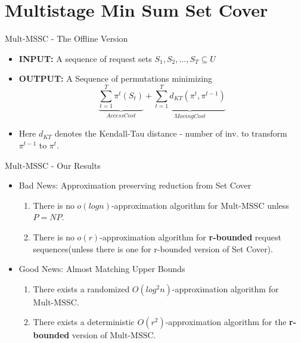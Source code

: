 \documentclass{beamer}
\def\DSSC{\mathrm{Mult}\text{-}\mathrm{MSSC}}
\begin{document}
\section{Multistage Min Sum Set Cover}

\begin{frame}{$\DSSC$ - The Offline Version}
    \begin{itemize}
         \item \textbf{INPUT:} A sequence of request sets $S_1, S_2, \ldots, S_T \subseteq U$
         \item \textbf{OUTPUT:} A Sequence of permutations minimizing
         $$\underbrace{\sum_{t=1}^T \pi^t ( S_t )}_{Access Cost} + \underbrace{\sum_{t=1}^T d_{KT}( \pi^t, \pi^{t-1} )}_{Moving Cost}$$
         \item Here $d_{KT}$ denotes the Kendall-Tau distance - number of inv. to transform $\pi^{t-1}$ to $\pi^t$.
    \end{itemize}
\end{frame}

\begin{frame}{$\DSSC$ - Our Results}
    \begin{itemize}
         \item Bad News: Approximation preserving reduction from Set Cover
            \begin{enumerate}
                 \item There is no $o(logn)$-approximation algorithm for $\DSSC$ unless $P=NP$.
                 \item There is no $o(r)$-approximation algorithm for \textbf{r-bounded} request sequences(unless there is one for r-bounded version of Set Cover).
            \end{enumerate}
         \item Good News: Almost Matching Upper Bounds
            \begin{enumerate}
                 \item There exists a randomized $O(log^2n)$-approximation algorithm for $\DSSC$.
                 \item There exists a deterministic $O(r^2)$-approximation algorithm for the \textbf{r-bounded} version of $\DSSC$.
            \end{enumerate}
    \end{itemize}
\end{frame}
\end{document}
